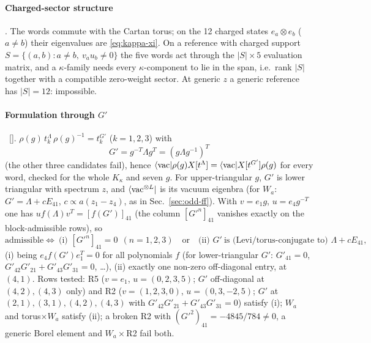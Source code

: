 \paragraph{Charged-sector structure} \ex. The words commute with the Cartan torus; on the 12 charged states $e_a\otimes e_b$ ($a\ne b$) their eigenvalues are \eqref{eq:kappa-xi}. On a reference with charged support $S=\{(a,b):a\ne b,\ v_au_b\ne0\}$ the five words act through the $|S|\times5$ evaluation matrix, and a $\kappa$-family needs every $\kappa$-component to lie in the span, i.e.\ rank $|S|$ together with a compatible zero-weight sector. At generic $z$ a generic reference has $|S|=12$: impossible.

\paragraph{Formulation through $G'$} \ex\ []. $\rho(g)\,t_k^\Lambda\,\rho(g)^{-1}=t_k^{G'}$ ($k=1,2,3$) with
\begin{equation}
 G'=g^{-T}\Lambda g^T=(g\Lambda g^{-1})^T
\end{equation}
(the other three candidates fail), hence $\langle\mathrm{vac}|\rho(g)X[t^\Lambda]=\langle\mathrm{vac}|X[t^{G'}]\rho(g)$ for every word, checked for the whole $K_\kappa$ and seven $g$. For upper-triangular $g$, $G'$ is lower triangular with spectrum $z$, and $\langle\mathrm{vac}^{\otimes L}|$ is its vacuum eigenbra
(for $W_a$: $G'=\Lambda+cE_{41}$, $c\propto a(z_1-z_4)$, as in Sec.~\ref{sec:odd-ff}). With $v=e_1g$, $u=e_4g^{-T}$ one has $u f(\Lambda)v^T=[f(G')]_{41}$ (the column $[G'^n]_{41}$ vanishes exactly on the block-admissible rows), so
\begin{equation}\label{eq:admiss-G}
 \text{admissible}\iff\ \text{(i) }[G'^n]_{41}=0\ \ (n=1,2,3)\quad\text{or}\quad\text{(ii) }G'\ \text{is (Levi/torus-conjugate to) }\Lambda+cE_{41},
\end{equation}
(i) being $e_4f(G')e_1^T=0$ for all polynomials $f$ (for lower-triangular $G'$: $G'_{41}=0$, $G'_{42}G'_{21}+G'_{43}G'_{31}=0$, \dots), (ii) exactly one non-zero off-diagonal entry, at $(4,1)$. Rows tested: R5 ($v=e_1$, $u=(0,2,3,5)$; $G'$ off-diagonal at $(4,2),(4,3)$ only) and R2 ($v=(1,2,3,0)$, $u=(0,3,-2,5)$;
$G'$ at $(2,1),(3,1),(4,2),(4,3)$ with $G'_{42}G'_{21}+G'_{43}G'_{31}=0$) satisfy (i); $W_a$ and torus$\times W_a$ satisfy (ii); a broken R2 with $(G'^2)_{41}=-4845/784\ne0$, a generic Borel element and $W_a\times$R2 fail both.

